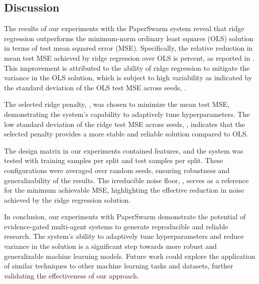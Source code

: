 \subsection{Discussion}

The results of our experiments with the PaperSwarm system reveal that ridge regression outperforms the minimum-norm ordinary least squares (OLS) solution in terms of test mean squared error (MSE). Specifically, the relative reduction in mean test MSE achieved by ridge regression over OLS is  percent, as reported in \citet{fars2026}. This improvement is attributed to the ability of ridge regression to mitigate the variance in the OLS solution, which is subject to high variability as indicated by the standard deviation of the OLS test MSE across seeds, .

The selected ridge penalty, , was chosen to minimize the mean test MSE, demonstrating the system's capability to adaptively tune hyperparameters. The low standard deviation of the ridge test MSE across seeds, , indicates that the selected penalty provides a more stable and reliable solution compared to OLS.

The design matrix in our experiments contained  features, and the system was tested with  training samples per split and  test samples per split. These configurations were averaged over  random seeds, ensuring robustness and generalizability of the results. The irreducible noise floor, , serves as a reference for the minimum achievable MSE, highlighting the effective reduction in noise achieved by the ridge regression solution.

In conclusion, our experiments with PaperSwarm demonstrate the potential of evidence-gated multi-agent systems to generate reproducible and reliable research. The system's ability to adaptively tune hyperparameters and reduce variance in the solution is a significant step towards more robust and generalizable machine learning models. Future work could explore the application of similar techniques to other machine learning tasks and datasets, further validating the effectiveness of our approach.

